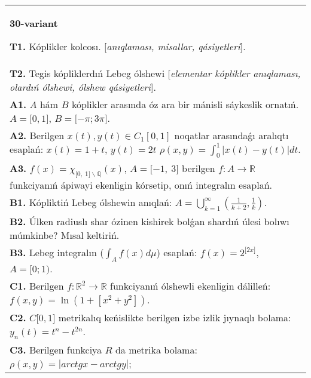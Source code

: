 \documentclass{article}
\begin{document}
\begin{tabular}{m{17cm}}
\textbf{30-variant}
\newline

\textbf{T1.} Kóplikler kolcosı. [\textit{anıqlaması, misallar, qásiyetleri}]. \\
\textbf{T2.} Tegis kópliklerdıń Lebeg ólshewi [\textit{elementar kóplikler anıqlaması, olardıń ólshewi, ólshew qásiyetleri}]. \\
\textbf{A1.} \(A\) hám \(B\) kóplikler arasında óz ara bir mánisli sáykeslik ornatıń. \(A = \lbrack 0,1\rbrack\), \(B = \lbrack - \pi;3\pi\rbrack\). \\
\textbf{A2.} Berilgen \(x(t),y(t)\in C_1[0,1]\) noqatlar arasındaǵı aralıqtı esaplań: \(x(t) = 1 + t\), \(y(t) = 2t\) \(\rho(x,y) = \int_{0}^{1}{\left| x(t) - y(t) \right|dt}\). \\
\textbf{A3.} \(f(x) = \chi_{\lbrack 0,\ 1\rbrack\backslash\mathbb{Q}}(x)\), \(A = \lbrack - 1,\ 3\rbrack\) berilgen \(f:A\rightarrow\mathbb{R}\) funkciyanıń ápiwayi ekenligin kórsetip, onıń integralın esaplań. \\
\textbf{B1.} Kópliktiń Lebeg ólshewin anıqlań: \(A = \bigcup_{k = 1}^{\infty}\left( \frac{1}{k + 2},\frac{1}{k} \right)\). \\
\textbf{B2.} Úlken radiuslı shar ózinen kishirek bolǵan shardıń úlesi bolıwı múmkinbe? Mısal keltiriń. \\
\textbf{B3.} Lebeg integralın (\(\int_{A}^{}{f(x)d\mu}\)) esaplań: \(f(x) = 2^{\lbrack 2x\rbrack}\), \(A = \lbrack 0;1)\). \\
\textbf{C1.} Berilgen \(f:\mathbb{R}^{2}\mathbb{\rightarrow R}\) funkciyanıń ólshewli ekenligin dálilleń: \(f(x,y) = \ln\left( 1 + \left\lbrack x^{2} + y^{2} \right\rbrack \right)\). \\
\textbf{C2.} \(C\lbrack 0,1\rbrack\) metrikalıq keńislikte berilgen izbe izlik jıynaqlı bolama: \(y_{n}(t) = t^{n} - t^{2n}\). \\
\textbf{C3.} Berilgen funkciya \(R\) da metrika bolama: \(\rho(x,y) = |arctgx - arctgy|\); \\

\end{tabular}
\vspace{1cm}
\end{document}
